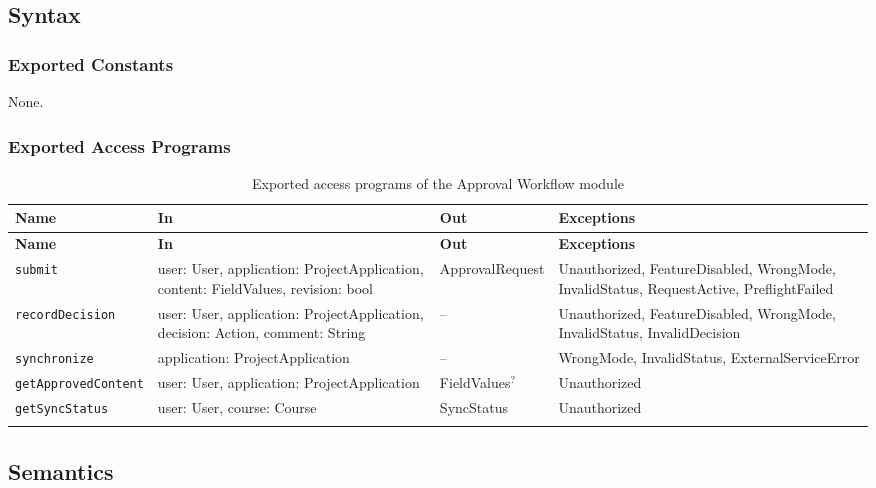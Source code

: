 \documentclass[12pt, titlepage]{article}
\begin{document}
\subsection{Syntax}

\subsubsection{Exported Constants}
None.

\subsubsection{Exported Access Programs}

\begingroup
\small
\setlength{\tabcolsep}{4pt}
\renewcommand{\arraystretch}{1.2}
\begin{longtable}{>{\raggedright\arraybackslash}p{}
                  >{\raggedright\arraybackslash}p{}
                  >{\raggedright\arraybackslash}p{}
                  >{\raggedright\arraybackslash}p{}}
\toprule
\textbf{Name} & \textbf{In} & \textbf{Out} & \textbf{Exceptions} \\
\midrule
\endfirsthead
\toprule
\textbf{Name} & \textbf{In} & \textbf{Out} & \textbf{Exceptions} \\
\midrule
\endhead
\endfoot
\texttt{submit} & user: User, application: ProjectApplication, content: FieldValues, revision: bool & ApprovalRequest & Unauthorized, FeatureDisabled, WrongMode, InvalidStatus, RequestActive, PreflightFailed \\
\texttt{recordDecision} & user: User, application: ProjectApplication, decision: Action, comment: String & -- & Unauthorized, FeatureDisabled, WrongMode, InvalidStatus, InvalidDecision \\
\texttt{synchronize} & application: ProjectApplication & -- & WrongMode, InvalidStatus, ExternalServiceError \\
\texttt{getApprovedContent} & user: User, application: ProjectApplication & FieldValues$^{?}$ & Unauthorized \\
\texttt{getSyncStatus} & user: User, course: Course & SyncStatus & Unauthorized \\
\bottomrule
\caption{Exported access programs of the Approval Workflow module}
\label{TblApprovalWorkflowAccessPrograms}
\end{longtable}
\endgroup

\subsection{Semantics}
\end{document}
